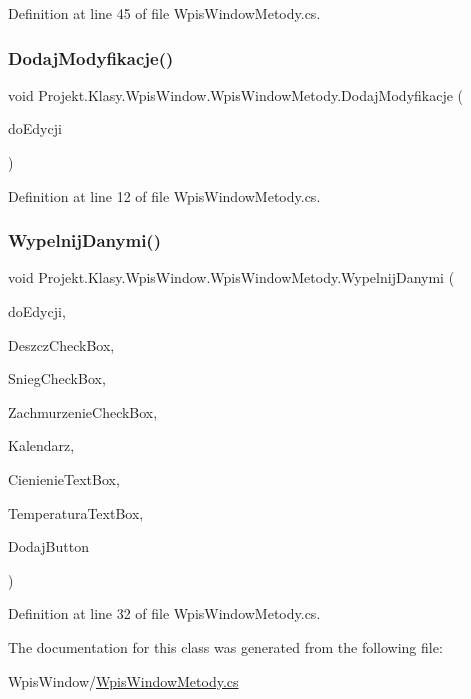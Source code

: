 Definition at line 45 of file Wpis\+Window\+Metody.\+cs.

\mbox{\label{class_projekt_1_1_klasy_1_1_wpis_window_1_1_wpis_window_metody_a0bf2da932cdb7689e3f4cc5e1e0e0243}} 
\subsubsection{\texorpdfstring{DodajModyfikacje()}{DodajModyfikacje()}}
{\footnotesize\ttfamily void Projekt.\+Klasy.\+Wpis\+Window.\+Wpis\+Window\+Metody.\+Dodaj\+Modyfikacje (\begin{DoxyParamCaption}\item[{List$<$ Pogoda $>$}]{do\+Edycji }\end{DoxyParamCaption})}



Definition at line 12 of file Wpis\+Window\+Metody.\+cs.

\mbox{\label{class_projekt_1_1_klasy_1_1_wpis_window_1_1_wpis_window_metody_a8d36f2b484338666ab870d6c0cfd3ba4}} 
\subsubsection{\texorpdfstring{WypelnijDanymi()}{WypelnijDanymi()}}
{\footnotesize\ttfamily void Projekt.\+Klasy.\+Wpis\+Window.\+Wpis\+Window\+Metody.\+Wypelnij\+Danymi (\begin{DoxyParamCaption}\item[{List$<$ Pogoda $>$}]{do\+Edycji,  }\item[{Check\+Box}]{Deszcz\+Check\+Box,  }\item[{Check\+Box}]{Snieg\+Check\+Box,  }\item[{Check\+Box}]{Zachmurzenie\+Check\+Box,  }\item[{Calendar}]{Kalendarz,  }\item[{Text\+Box}]{Cienienie\+Text\+Box,  }\item[{Text\+Box}]{Temperatura\+Text\+Box,  }\item[{Button}]{Dodaj\+Button }\end{DoxyParamCaption})}



Definition at line 32 of file Wpis\+Window\+Metody.\+cs.



The documentation for this class was generated from the following file\+:\begin{DoxyCompactItemize}
\item 
Wpis\+Window/\mbox{\hyperlink{_wpis_window_metody_8cs}{Wpis\+Window\+Metody.\+cs}}\end{DoxyCompactItemize}
